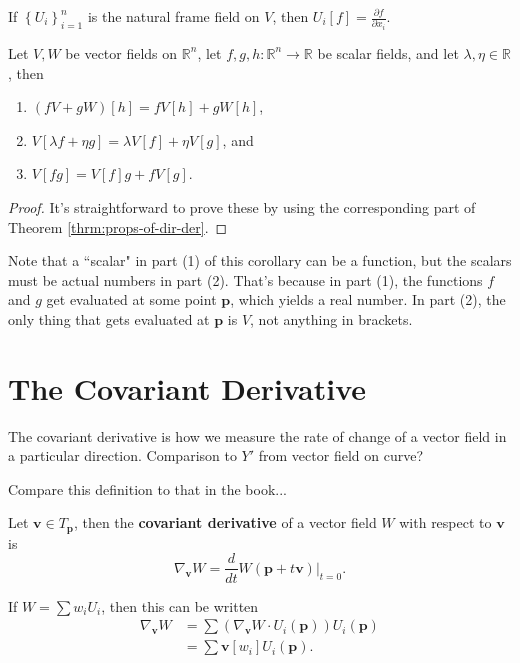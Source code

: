 \documentclass[twoside,10pt]{report}
\begin{document}
\begin{ex}
If $\left\{ U_i \right\}_{i=1}^n$ is the natural frame field on $V$, then $U_i[f] = \frac{\partial f}{\partial x_i} .$
\end{ex}

\begin{cor}
	Let $V,W$ be vector fields on $\mathbb{R}^n$, let $f,g,h:\mathbb{R}^n \to \mathbb{R}$ be scalar fields, and let $\lambda,\eta \in \mathbb{R}$, then
	\begin{enumerate}
		\item $(fV+gW)[h] = fV[h] + gW[h]$,
		\item $V[\lambda f+\eta g] = \lambda V[f] + \eta V[g]$, and
		\item $V[fg] = V[f] g + f V[g]$.
	\end{enumerate}
\end{cor}
\begin{proof}
	It's straightforward to prove these by using the corresponding part of Theorem \ref{thrm:props-of-dir-der}.
\end{proof}

Note that a ``scalar" in part (1) of this corollary can be a function, but the scalars must be actual numbers in part (2). That's because in part (1), the functions $f$ and $g$ get evaluated at some point $\mathbf{p}$, which yields a real number. In part (2), the only thing that gets evaluated at $\mathbf{p}$ is $V$, not anything in brackets.



\section{The Covariant Derivative}

The covariant derivative is how we measure the rate of change of a vector field in a particular direction. {\color{red}Comparison to $Y'$ from vector field on curve?}

{\color{red}Compare this definition to that in the book...}

\begin{defn}[]
	Let $\mathbf{v} \in T_{\mathbf{p}}$, then the \textbf{covariant derivative} of a vector field $W$ with respect to $\mathbf{v}$ is
	\[
		\nabla_{\mathbf{v}}W = \frac{d }{d t} W(\mathbf{p}+t\mathbf{v})\Big|_{t=0}.
	\] 
\end{defn}

If $W = \sum w_i U_i$, then this can be written
\begin{align*}
	\nabla_{\mathbf{v}}W &= \sum \left( \nabla_{\mathbf{v}}W \cdot U_i(\mathbf{p}) \right) U_i(\mathbf{p}) \\
			     &= \sum \mathbf{v}[w_i]U_i(\mathbf{p}).
\end{align*}
\end{document}
